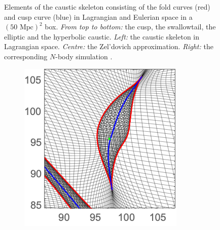 \documentclass[a4paper, 11pt]{article}
\begin{document}
\begin{figure}
\begin{subfigure}[b]{0.28\textwidth}
\end{subfigure}
\caption{Elements of the caustic skeleton consisting of the fold curves (red) and cusp curve (blue) in Lagrangian and Eulerian space in a $(50 \text{ Mpc})^2$ box. \textit{From top to bottom:} the cusp, the swallowtail, the elliptic and the hyperbolic caustic. \textit{Left:} the caustic skeleton in Lagrangian space. \textit{Centre:} the Zel'dovich approximation. \textit{Right:} the corresponding $N$-body simulation \cite{Hidding:2020}.}\label{fig:caustics_Examples_Big}
\end{figure}




\begin{figure}
\centering
\begin{subfigure}[b]{0.24\textwidth}
\includegraphics[width=\textwidth]{Cusp_Z_Zoom}
\end{subfigure}~
\begin{subfigure}[b]{0.24\textwidth}

\end{subfigure}
\end{figure}
\end{document}
